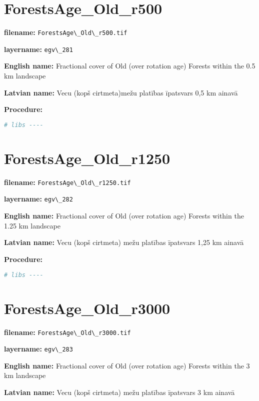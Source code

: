 \documentclass[
]{book}
\newcommand{\passthrough}[1]{#1}
\begin{document}
\section{ForestsAge\_Old\_r500}\label{ch06.281}

\textbf{filename:} \passthrough{\lstinline!ForestsAge\_Old\_r500.tif!}

\textbf{layername:} \passthrough{\lstinline!egv\_281!}

\textbf{English name:} Fractional cover of Old (over rotation age) Forests within the 0.5 km landscape

\textbf{Latvian name:} Vecu (kopš cirtmeta)mežu platības īpatsvars 0,5 km ainavā

\textbf{Procedure:}

\begin{lstlisting}[language=R]
# libs ----
\end{lstlisting}

\section{ForestsAge\_Old\_r1250}\label{ch06.282}

\textbf{filename:} \passthrough{\lstinline!ForestsAge\_Old\_r1250.tif!}

\textbf{layername:} \passthrough{\lstinline!egv\_282!}

\textbf{English name:} Fractional cover of Old (over rotation age) Forests within the 1.25 km landscape

\textbf{Latvian name:} Vecu (kopš cirtmeta) mežu platības īpatsvars 1,25 km ainavā

\textbf{Procedure:}

\begin{lstlisting}[language=R]
# libs ----
\end{lstlisting}

\section{ForestsAge\_Old\_r3000}\label{ch06.283}

\textbf{filename:} \passthrough{\lstinline!ForestsAge\_Old\_r3000.tif!}

\textbf{layername:} \passthrough{\lstinline!egv\_283!}

\textbf{English name:} Fractional cover of Old (over rotation age) Forests within the 3 km landscape

\textbf{Latvian name:} Vecu (kopš cirtmeta) mežu platības īpatsvars 3 km ainavā
\end{document}
